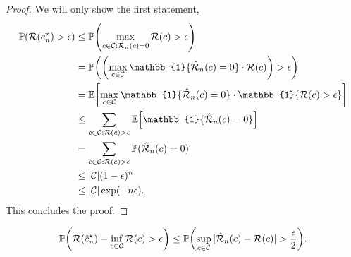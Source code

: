 \begin{proof}
    We will only show the first statement,
    \begin{align*}
        \mathbb{P}(\mathcal{R}(c^\star_n) > \epsilon) & \leq \mathbb{P} \lft( \max_{c \in \mathcal{C} : \hat{\mathcal{R}}_n(c) = 0} \mathcal{R}(c) > \epsilon \rgt)                              \\
                                                      & = \mathbb{P} \lft( \lft( \max_{c \in \mathcal{C}} \mathbb{1}\{ \hat{\mathcal{R}}_n(c) = 0 \} \cdot \mathcal{R}(c) \rgt) > \epsilon \rgt) \\
                                                      & = \E \lft[ \max_{c \in \mathcal{C}} \mathbb{1}\{ \hat{\mathcal{R}}_n(c) = 0 \} \cdot \mathbb{1}\{ \mathcal{R}(c) > \epsilon \} \rgt]     \\
                                                      & \leq \sum_{c \in \mathcal{C} : \mathcal{R}(c) > \epsilon}  \E \lft[ \mathbb{1} \{ \hat{\mathcal{R}}_n(c) = 0 \} \rgt]                    \\
                                                      & = \sum_{c \in \mathcal{C} : \mathcal{R}(c) > \epsilon}  \mathbb{P}(\hat{\mathcal{R}}_n(c) = 0)                                           \\
                                                      & \leq |\mathcal{C}| (1-\epsilon)^n                                                                                                        \\
                                                      & \leq |\mathcal{C}| \exp(-n \epsilon).
    \end{align*}
    This concludes the proof.
\end{proof}

\begin{theorem}[VC inequality]
    \[
        \mathbb{P} \lft( \mathcal{R}(\hat{c}^\star_n) - \inf_{c \in \mathcal{C}} \mathcal{R}(c) > \epsilon \rgt) \leq \mathbb{P} \lft( \sup_{c \in \mathcal{C}} |\hat{\mathcal{R}}_n(c) - \mathcal{R}(c)| > \frac{\epsilon}{2} \rgt).
    \]
\end{theorem}


